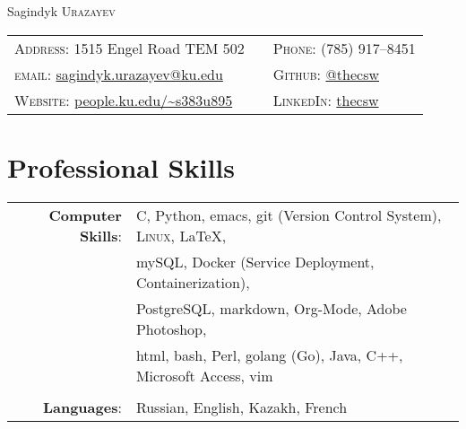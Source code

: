 \documentclass[a4paper,10pt]{article}
\begin{document}
\pagestyle{empty} %

\par{\centering
		{\Huge Sagindyk \textsc{Urazayev}
	}\bigskip\par}

      \begin{center}
        \begin{tabular}{lcl}
          \textsc{Address:}   1515 Engel Road TEM 502 &&
                                                         \textsc{Phone:}      (785) 917--8451\\
          \textsc{email:}      \href{mailto:sagindyk.urazayev@ku.edu}{sagindyk.urazayev@ku.edu}&&
                                                                                                  \textsc{Github:} \href{https://github.com/thecsw}{@thecsw}\\
          \textsc{Website:} \href{http://people.ku.edu/~s383u895}{people.ku.edu/\textasciitilde{}s383u895} && \textsc{LinkedIn:} \href{https://linkedin.com/in/thecsw}{thecsw}\\
        \end{tabular}
      \end{center}
      
\section{Professional Skills}
\begin{tabular}{rl}

  \textbf{Computer Skills}:& C, Python, emacs, git (Version Control System), \textsc{Linux}, \LaTeX, \\& mySQL,
  Docker (Service Deployment, Containerization),\\&
  PostgreSQL, markdown, Org-Mode, Adobe Photoshop, \\& html, bash, Perl, golang (Go), Java, C++, Microsoft Access, vim\\\\

  \textbf{Languages}: &Russian, English, Kazakh, French\\
  
\end{tabular}
\end{document}

